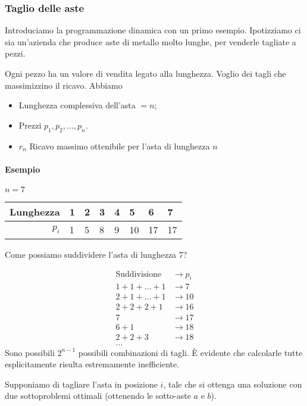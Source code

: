 \subsubsection{Taglio delle aste}

Introduciamo la programmazione dinamica con un primo esempio. Ipotizziamo ci sia un'azienda che produce aste di metallo
molto lunghe, per venderle tagliate a pezzi.

Ogni pezzo ha un valore di vendita legato alla lunghezza. Voglio dei tagli che massimizzino il ricavo. Abbiamo
\begin{itemize}
    \item Lunghezza complessiva dell'asta $= n$;
    \item Prezzi $p_1, p_2, \dots , p_n$.
    \item $r_n$ Ricavo massimo ottenibile per l'asta di lunghezza $n$
\end{itemize}

\paragraph{Esempio} $n = 7$

\begin{center}
    \begin{tabular}{r|l|l|l|l|l|l|l}
        Lunghezza & 1 & 2 & 3 & 4 & 5 & 6 & 7 \\
        \hline
        $p_i$ & 1 & 5 & 8 & 9 & 10 & 17 & 17
    \end{tabular}
\end{center}
Come possiamo suddividere l'asta di lunghezza 7?

\begin{align*}
    \text{Suddivisione} & \rightarrow p_i \\
    1+1+ \dots +1 & \rightarrow 7 \\
    2+1+ \dots +1 & \rightarrow 10 \\
    2+2+2+1 & \rightarrow 16 \\
    7  & \rightarrow 17 \\
    6+1  & \rightarrow 18 \\
    2+2+3 & \rightarrow 18 \\
    \dots
\end{align*}
Sono possibili $2^{n-1}$ possibili combinazioni di tagli. È evidente che calcolarle tutte esplicitamente risulta estremamente inefficiente.

Supponiamo di tagliare l'asta in posizione $i$, tale che si ottenga una soluzione con due sottoproblemi ottimali (ottenendo le sotto-aste $a$ e $b$).

